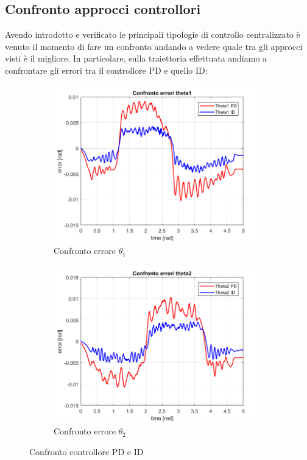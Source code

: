 \subsection{Confronto approcci controllori}
Avendo introdotto e verificato le principali tipologie di controllo centralizzato è venuto il momento di fare un confronto andando a vedere quale tra gli approcci visti è il migliore. In particolare, sulla traiettoria effettuata andiamo a confrontare gli errori tra il controllore PD e quello ID:
\begin{figure}[!ht]
\begin{subfigure}{.53\textwidth}
  \centering
  \includegraphics[width=.8\linewidth]{Immagini/Traiettorie/ConfontoErroriTheta1}  
  \caption{Confronto errore $\theta_1$ }
  \label{fig:sub-tid1}
\end{subfigure}
\begin{subfigure}{.53\textwidth}
  \centering
  \includegraphics[width=.8\linewidth]{Immagini/Traiettorie/ConfontoErroriTheta2}  
  \caption{Confronto errore $\theta_2$}
  \label{fig:sub-tid2}
\end{subfigure}
\caption{Confronto controllore PD e ID}
\end{figure}

